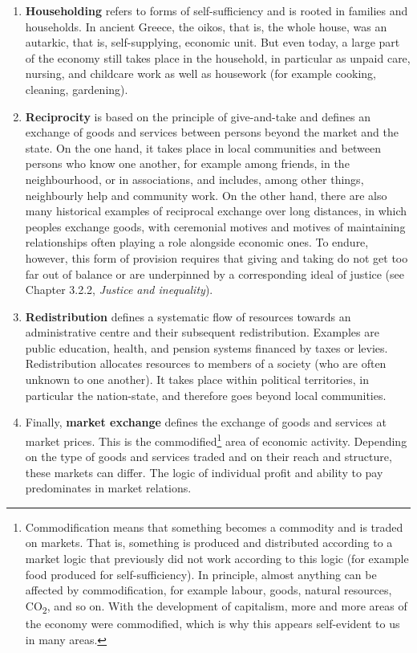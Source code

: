 \documentclass[
  british,
  a4paper,
  DIV=11,
  numbers=noendperiod,
  oneside,
  openany]{scrreprt}
\begin{document}
\begin{enumerate}
\def\labelenumi{(\arabic{enumi})}
\item
  \textbf{Householding} refers to forms of self-sufficiency and is
  rooted in families and households. In ancient Greece, the oikos, that
  is, the whole house, was an autarkic, that is, self-supplying,
  economic unit. But even today, a large part of the economy still takes
  place in the household, in particular as unpaid care, nursing, and
  childcare work as well as housework (for example cooking, cleaning,
  gardening).
\item
  \textbf{Reciprocity} is based on the principle of give-and-take and
  defines an exchange of goods and services between persons beyond the
  market and the state. On the one hand, it takes place in local
  communities and between persons who know one another, for example
  among friends, in the neighbourhood, or in associations, and includes,
  among other things, neighbourly help and community work. On the other
  hand, there are also many historical examples of reciprocal exchange
  over long distances, in which peoples exchange goods, with ceremonial
  motives and motives of maintaining relationships often playing a role
  alongside economic ones. To endure, however, this form of provision
  requires that giving and taking do not get too far out of balance or
  are underpinned by a corresponding ideal of justice (see Chapter
  3.2.2, \emph{Justice and inequality}).
\item
  \textbf{Redistribution} defines a systematic flow of resources towards
  an administrative centre and their subsequent redistribution. Examples
  are public education, health, and pension systems financed by taxes or
  levies. Redistribution allocates resources to members of a society
  (who are often unknown to one another). It takes place within
  political territories, in particular the nation-state, and therefore
  goes beyond local communities.
\item
  Finally, \textbf{market exchange} defines the exchange of goods and
  services at market prices. This is the commodified\footnote{Commodification
    means that something becomes a commodity and is traded on markets.
    That is, something is produced and distributed according to a market
    logic that previously did not work according to this logic (for
    example food produced for self-sufficiency). In principle, almost
    anything can be affected by commodification, for example labour,
    goods, natural resources, CO\textsubscript{2}, and so on. With the
    development of capitalism, more and more areas of the economy were
    commodified, which is why this appears self-evident to us in many
    areas.} area of economic activity. Depending on the type of goods
  and services traded and on their reach and structure, these markets
  can differ. The logic of individual profit and ability to pay
  predominates in market relations.
\end{enumerate}
\end{document}
